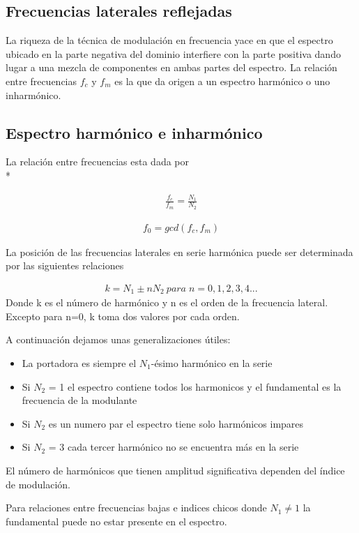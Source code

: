 \documentclass[assd_tp2_main.tex]{subfiles}
\begin{document}
\subsection*{Frecuencias laterales reflejadas}
La riqueza de la técnica de modulación en frecuencia yace en que el espectro ubicado en la parte negativa del dominio interfiere con la parte positiva dando lugar a una mezcla de componentes en ambas partes del espectro. La relación entre frecuencias $f_c$ y $f_m$ es la que da origen a un espectro harmónico o uno inharmónico.
\subsection*{Espectro harmónico e inharmónico}
La relación entre frecuencias esta dada por \\*

\begin{eqnarray*}
\displaystyle \frac{f_c}{f_m}=\frac{N_1}{N_2} 
\end{eqnarray*}
 
\begin{eqnarray*}
\displaystyle f_0=gcd(f_c,f_m)
\end{eqnarray*}
 
La posición de las frecuencias laterales en serie harmónica puede ser determinada por las siguientes relaciones

\begin{eqnarray*}
\displaystyle k = N_1 \pm nN_2 \: para\; n=0,1,2,3,4...
\end{eqnarray*}
Donde k es el  número de harmónico y n es el orden de la frecuencia lateral.
Excepto para n=0, k toma dos valores por cada orden.

A continuación dejamos unas generalizaciones útiles:
\begin{itemize}
\item La portadora es siempre el $N_1$-ésimo harmónico  en la serie
\item Si $N_2$ = 1 el espectro contiene todos los harmonicos	y el fundamental es la frecuencia de la modulante
\item Si $N_2$ es un numero par el espectro tiene solo harmónicos impares
\item Si $N_2$ = 3 cada tercer harmónico no se encuentra más en la serie
\end{itemize}
 

El número de harmónicos que tienen amplitud significativa  dependen del índice de modulación.

Para relaciones entre frecuencias bajas e indices chicos donde $N_1\neq1$ la fundamental puede no estar presente en el espectro.
\end{document}
